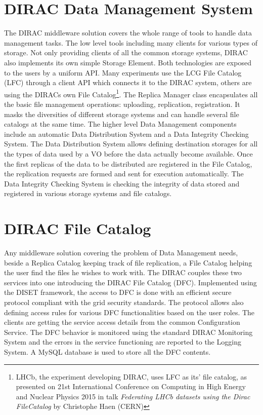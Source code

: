 \section{DIRAC Data Management System}

The DIRAC middleware solution covers the whole range of tools to handle data management tasks. The low level 
tools including many clients for various types of storage. Not only providing clients of all 
the common storage systems, DIRAC also implements its own simple Storage Element. Both technologies are 
exposed to the users by a uniform API. Many experiments use the LCG
File Catalog (LFC) through a client API which connects it to the DIRAC system, others are using 
the DIRACs own File Catalog\footnote{LHCb, the experiment developing DIRAC, uses LFC as its' file catalog, as 
presented on 21st International Conference on Computing in High Energy and Nuclear
Physics 2015 in talk \textit{Federating LHCb datasets using the Dirac FileCatalog} by Christophe Haen (CERN)}. 
The Replica Manager class encapsulates all the basic file 
management operations: uploading, replication, registration. It masks the diversities 
of different storage systems and can handle several file catalogs at the same time. 
The higher level Data Management components include an automatic Data Distribution System and
a Data Integrity Checking System. The Data Distribution System allows defining destination storages
for all the types of data used by a VO before the data actually become available. Once the first replicas
of the data to be distributed are registered in the File Catalog, the replication requests are formed and
sent for execution automatically. The Data Integrity Checking System is checking the integrity of data stored and
registered in various storage systems and file catalogs. 

\section{DIRAC File Catalog}

Any middleware solution covering the problem of Data Management needs, beside a Replica Catalog keeping track of 
file replication, a File Catalog helping the user find the files he wishes to work with. The DIRAC 
couples these two services into one introducing the DIRAC File Catalog (DFC)\cite{DFC}. 
Implemented using the DISET framework, the access to DFC is done with an efficient secure 
protocol compliant with the grid security standards.
The protocol allows also defining access rules for various DFC functionalities based on the user roles. The
clients are getting the service access details from the common Configuration Service. The DFC behavior
is monitored using the standard DIRAC Monitoring System and the errors in the service functioning are
reported to the Logging System. A MySQL database is used to store all the DFC contents. 

